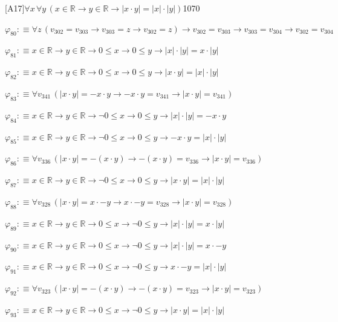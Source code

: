 \begin{fullproof}{[A17]}{$\forall x\,\forall y\,(x \in \mathbb{R} \to y \in \mathbb{R} \to \lvert x \cdot y \rvert = \lvert x \rvert \cdot \lvert y \rvert)$}{1070}
\begin{abbrevlist}
\item $\varphi_{80} :\equiv \forall z\,(v_{302} = v_{303} \to v_{303} = z \to v_{302} = z) \to v_{302} = v_{303} \to v_{303} = v_{304} \to v_{302} = v_{304}$
\item $\varphi_{81} :\equiv x \in \mathbb{R} \to y \in \mathbb{R} \to 0 \leq x \to 0 \leq y \to \lvert x \rvert \cdot \lvert y \rvert = x \cdot \lvert y \rvert$
\item $\varphi_{82} :\equiv x \in \mathbb{R} \to y \in \mathbb{R} \to 0 \leq x \to 0 \leq y \to \lvert x \cdot y \rvert = \lvert x \rvert \cdot \lvert y \rvert$
\item $\varphi_{83} :\equiv \forall v_{341}\,(\lvert x \cdot y \rvert = -x \cdot y \to -x \cdot y = v_{341} \to \lvert x \cdot y \rvert = v_{341})$
\item $\varphi_{84} :\equiv x \in \mathbb{R} \to y \in \mathbb{R} \to \neg 0 \leq x \to 0 \leq y \to \lvert x \rvert \cdot \lvert y \rvert = -x \cdot y$
\item $\varphi_{85} :\equiv x \in \mathbb{R} \to y \in \mathbb{R} \to \neg 0 \leq x \to 0 \leq y \to -x \cdot y = \lvert x \rvert \cdot \lvert y \rvert$
\item $\varphi_{86} :\equiv \forall v_{336}\,(\lvert x \cdot y \rvert = -(x \cdot y) \to -(x \cdot y) = v_{336} \to \lvert x \cdot y \rvert = v_{336})$
\item $\varphi_{87} :\equiv x \in \mathbb{R} \to y \in \mathbb{R} \to \neg 0 \leq x \to 0 \leq y \to \lvert x \cdot y \rvert = \lvert x \rvert \cdot \lvert y \rvert$
\item $\varphi_{88} :\equiv \forall v_{328}\,(\lvert x \cdot y \rvert = x \cdot -y \to x \cdot -y = v_{328} \to \lvert x \cdot y \rvert = v_{328})$
\item $\varphi_{89} :\equiv x \in \mathbb{R} \to y \in \mathbb{R} \to 0 \leq x \to \neg 0 \leq y \to \lvert x \rvert \cdot \lvert y \rvert = x \cdot \lvert y \rvert$
\item $\varphi_{90} :\equiv x \in \mathbb{R} \to y \in \mathbb{R} \to 0 \leq x \to \neg 0 \leq y \to \lvert x \rvert \cdot \lvert y \rvert = x \cdot -y$
\item $\varphi_{91} :\equiv x \in \mathbb{R} \to y \in \mathbb{R} \to 0 \leq x \to \neg 0 \leq y \to x \cdot -y = \lvert x \rvert \cdot \lvert y \rvert$
\item $\varphi_{92} :\equiv \forall v_{323}\,(\lvert x \cdot y \rvert = -(x \cdot y) \to -(x \cdot y) = v_{323} \to \lvert x \cdot y \rvert = v_{323})$
\item $\varphi_{93} :\equiv x \in \mathbb{R} \to y \in \mathbb{R} \to 0 \leq x \to \neg 0 \leq y \to \lvert x \cdot y \rvert = \lvert x \rvert \cdot \lvert y \rvert$

\end{abbrevlist}
\end{fullproof}
